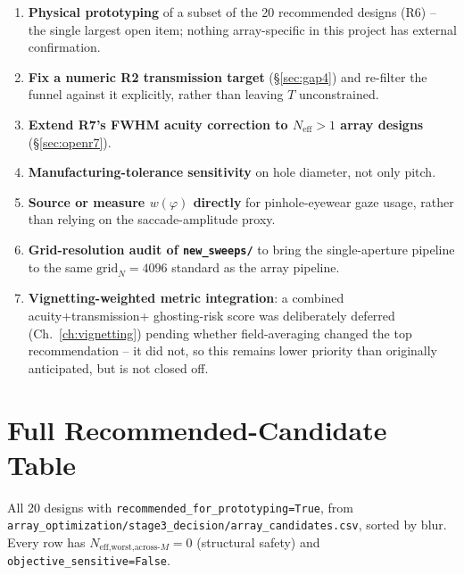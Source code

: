 \documentclass[11pt]{report}
\newcommand{\Neff}{N_{\text{eff}}}
\begin{document}
\begin{enumerate}[nosep]
\item \textbf{Physical prototyping} of a subset of the 20 recommended designs (R6) --
the single largest open item; nothing array-specific in this project has external
confirmation.
\item \textbf{Fix a numeric R2 transmission target} (\S\ref{sec:gap4}) and re-filter the
funnel against it explicitly, rather than leaving $T$ unconstrained.
\item \textbf{Extend R7's FWHM acuity correction to $\Neff>1$ array designs}
(\S\ref{sec:openr7}).
\item \textbf{Manufacturing-tolerance sensitivity} on hole diameter, not only pitch.
\item \textbf{Source or measure $w(\varphi)$ directly} for pinhole-eyewear gaze usage, rather
than relying on the saccade-amplitude proxy.
\item \textbf{Grid-resolution audit of \texttt{new\_sweeps/}} to bring the single-aperture
pipeline to the same $\text{grid}_N{=}4096$ standard as the array pipeline.
\item \textbf{Vignetting-weighted metric integration}: a combined acuity+transmission+
ghosting-risk score was deliberately deferred (Ch.~\ref{ch:vignetting}) pending whether
field-averaging changed the top recommendation -- it did not, so this remains lower priority
than originally anticipated, but is not closed off.
\end{enumerate}

\appendix
\chapter{Full Recommended-Candidate Table}
All 20 designs with \texttt{recommended\_for\_prototyping=True}, from
\texttt{array\_optimization/stage3\_decision/array\_candidates.csv}, sorted by blur. Every
row has $N_{\text{eff,worst,across-}M}=0$ (structural safety) and
\texttt{objective\_sensitive=False}.
\end{document}
